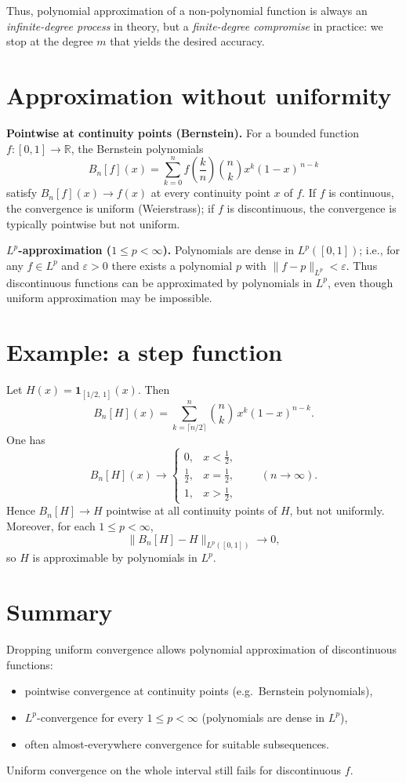 \documentclass[12pt,a4paper]{article}
\theoremstyle{plain}
\theoremstyle{definition}
\theoremstyle{remark}
\theoremstyle{remark}
\begin{document}
\bigskip

\noindent
Thus, polynomial approximation of a non-polynomial function is always an
\emph{infinite-degree process} in theory, but a \emph{finite-degree compromise}
in practice: we stop at the degree $m$ that yields the desired accuracy.

\section*{Approximation without uniformity}

\noindent\textbf{Pointwise at continuity points (Bernstein).}
For a bounded function $f:[0,1]\to\mathbb{R}$, the Bernstein polynomials
\[
B_n[f](x)=\sum_{k=0}^n f\!\left(\frac{k}{n}\right)\binom{n}{k} x^k(1-x)^{\,n-k}
\]
satisfy $B_n[f](x)\to f(x)$ at every continuity point $x$ of $f$. If $f$ is continuous, the convergence is uniform (Weierstrass); if $f$ is discontinuous, the convergence is typically pointwise but not uniform.

\smallskip

\noindent\textbf{$L^p$-approximation ($1\le p<\infty$).}
Polynomials are dense in $L^p([0,1])$; i.e., for any $f\in L^p$ and $\varepsilon>0$ there exists a polynomial $p$
with $\|f-p\|_{L^p}<\varepsilon$. Thus discontinuous functions can be approximated by polynomials in $L^p$,
even though uniform approximation may be impossible.

\bigskip

\section*{Example: a step function}

Let $H(x)=\mathbf{1}_{[1/2,\,1]}(x)$. Then
\[
B_n[H](x)=\sum_{k=\lceil n/2\rceil}^{n}\binom{n}{k}\,x^k(1-x)^{n-k}.
\]
One has
\[
B_n[H](x)\to
\begin{cases}
	0, & x<\tfrac{1}{2},\\[2pt]
	\tfrac12, & x=\tfrac{1}{2},\\[2pt]
	1, & x>\tfrac{1}{2},
\end{cases}
\qquad (n\to\infty).
\]
Hence $B_n[H]\to H$ pointwise at all continuity points of $H$, but not uniformly.
Moreover, for each $1\le p<\infty$,
\[
\|B_n[H]-H\|_{L^p([0,1])}\longrightarrow 0,
\]
so $H$ is approximable by polynomials in $L^p$.

\bigskip

\section*{Summary}
Dropping uniform convergence allows polynomial approximation of discontinuous functions:
\begin{itemize}\setlength{\itemsep}{0.6em}
	\item pointwise convergence at continuity points (e.g.\ Bernstein polynomials),
	\item $L^p$-convergence for every $1\le p<\infty$ (polynomials are dense in $L^p$),
	\item often almost-everywhere convergence for suitable subsequences.
\end{itemize}
Uniform convergence on the whole interval still fails for discontinuous $f$.
\end{document}
